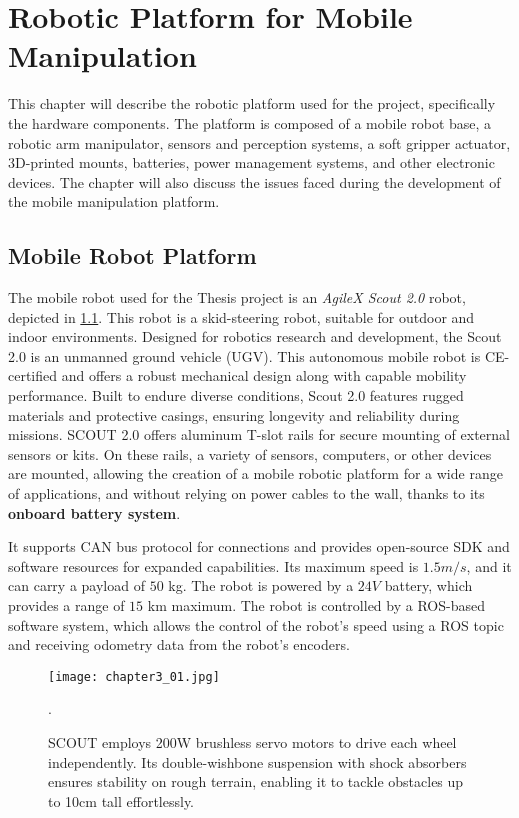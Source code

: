 
\chapter{Robotic Platform for Mobile Manipulation}

This chapter will describe the robotic platform used for the project, specifically the hardware components.
The platform is composed of a mobile robot base, a robotic arm manipulator, sensors and perception systems, 
a soft gripper actuator, 3D-printed mounts, batteries, power management systems, and other electronic devices.
The chapter will also discuss the issues faced during the development of the mobile manipulation platform.

\section{Mobile Robot Platform}

The mobile robot used for the Thesis project is an \textit{AgileX Scout 2.0} robot, depicted in \ref{fig:c3_img01}.
This robot is a skid-steering robot, suitable for outdoor and indoor environments. 
Designed for robotics research and development, the Scout 2.0 is an unmanned ground vehicle (UGV). 
This autonomous mobile robot is CE-certified and offers a robust mechanical design along with capable mobility performance. 
Built to endure diverse conditions, Scout 2.0 features rugged materials and protective casings, ensuring longevity
and reliability during missions. SCOUT 2.0 offers aluminum T-slot rails for secure mounting of external sensors or kits. 
On these rails, a variety of sensors, computers, or other devices are mounted, allowing the creation of a mobile robotic platform
for a wide range of applications, and without relying on power cables to the wall, thanks to its 
\textbf{onboard battery system}.

It supports CAN bus protocol for connections and provides open-source SDK and software resources for expanded capabilities.
Its maximum speed is $1.5 m/s$, and it can carry a payload of $50$ kg. 
The robot is powered by a $24V$ battery, which provides a range of $15$ km maximum. 
The robot is controlled by a ROS-based software system, which allows the control of the robot's speed using a ROS topic
and receiving odometry data from the robot's encoders.

\begin{figure}[t]
	\centering
	\texttt{[image: chapter3\_01.jpg]}
	\captionsetup{width=1\linewidth}
	\caption{SCOUT employs 200W brushless servo motors to drive each wheel independently. 
    Its double-wishbone suspension with shock absorbers ensures stability on rough terrain, 
    enabling it to tackle obstacles up to 10cm tall effortlessly.}.
	\label{fig:c3_img01}
\end{figure}

